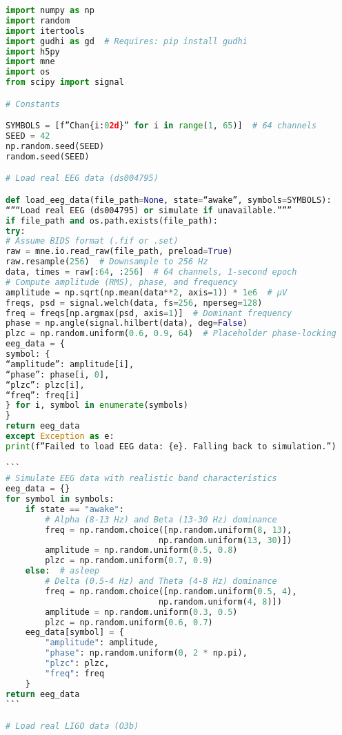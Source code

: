 \documentclass[11pt]{article}
\begin{document}
\begin{lstlisting}[language=Python, caption={EEG-LIGO Combined Analysis - Complete Code}]
import numpy as np
import random
import itertools
import gudhi as gd  # Requires: pip install gudhi
import h5py
import mne
import os
from scipy import signal

# Constants

SYMBOLS = [f”Chan{i:02d}” for i in range(1, 65)]  # 64 channels
SEED = 42
np.random.seed(SEED)
random.seed(SEED)

# Load real EEG data (ds004795)

def load_eeg_data(file_path=None, state=“awake”, symbols=SYMBOLS):
“”“Load real EEG (ds004795) or simulate if unavailable.”””
if file_path and os.path.exists(file_path):
try:
# Assume BIDS format (.fif or .set)
raw = mne.io.read_raw(file_path, preload=True)
raw.resample(256)  # Downsample to 256 Hz
data, times = raw[:64, :256]  # 64 channels, 1-second epoch
# Compute amplitude (RMS), phase, and frequency
amplitude = np.sqrt(np.mean(data**2, axis=1)) * 1e6  # μV
freqs, psd = signal.welch(data, fs=256, nperseg=128)
freq = freqs[np.argmax(psd, axis=1)]  # Dominant frequency
phase = np.angle(signal.hilbert(data), deg=False)
plzc = np.random.uniform(0.6, 0.9, 64)  # Placeholder phase-locking
eeg_data = {
symbol: {
“amplitude”: amplitude[i],
“phase”: phase[i, 0],
“plzc”: plzc[i],
“freq”: freq[i]
} for i, symbol in enumerate(symbols)
}
return eeg_data
except Exception as e:
print(f”Failed to load EEG data: {e}. Falling back to simulation.”)

```
# Simulate EEG data with realistic band characteristics
eeg_data = {}
for symbol in symbols:
    if state == "awake":
        # Alpha (8-13 Hz) and Beta (13-30 Hz) dominance
        freq = np.random.choice([np.random.uniform(8, 13), 
                               np.random.uniform(13, 30)])
        amplitude = np.random.uniform(0.5, 0.8)
        plzc = np.random.uniform(0.7, 0.9)
    else:  # asleep
        # Delta (0.5-4 Hz) and Theta (4-8 Hz) dominance
        freq = np.random.choice([np.random.uniform(0.5, 4), 
                               np.random.uniform(4, 8)])
        amplitude = np.random.uniform(0.3, 0.5)
        plzc = np.random.uniform(0.6, 0.7)
    eeg_data[symbol] = {
        "amplitude": amplitude,
        "phase": np.random.uniform(0, 2 * np.pi),
        "plzc": plzc,
        "freq": freq
    }
return eeg_data
```

# Load real LIGO data (O3b)


\end{lstlisting}
\end{document}
